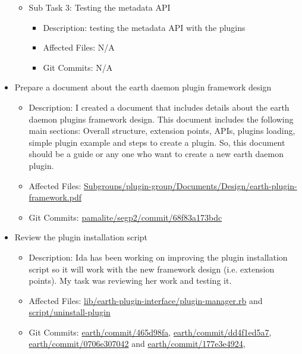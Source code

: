 \documentclass{article}
\begin{document}
\begin{itemize}
\begin{itemize}
\begin{itemize}
			\end{itemize}
		\item Sub Task 3: Testing the metadata API
			\begin{itemize}
			\item Description: testing the metadata API with the plugins  
			\item Affected Files: N/A
			\item Git Commits: N/A
			
			\end{itemize}
		\end{itemize} 
\newpage     
	\item Prepare a document about the earth daemon plugin framework design
		\begin{itemize}
		\item Description: I created a document that includes details about the earth daemon plugins framework design. This document includes the following main sections: Overall structure, extension points, APIs, plugins loading, simple plugin example and steps to create a plugin. So, this document should be a guide or any one who want to create a new earth daemon plugin. 
		\item Affected Files: \href{https://github.com/pamalite/segp2/tree/master/Subgroups/plugin_group/Documents/Design/earth_plugin_framework.pdf}{Subgroups/plugin-group/Documents/Design/earth-plugin-framework.pdf}
		\item Git Commits: \href{https://github.com/pamalite/segp2/commit/68f83a173bdc}{pamalite/segp2/commit/68f83a173bdc}
		
		\end{itemize}
	\item Review the plugin installation script 
		\begin{itemize}
		\item Description: Ida has been working on improving the plugin installation script so it will work with the new framework design (i.e. extension points). My task was reviewing her work and testing it. 
		\item Affected Files: \href{http://github.com/mfbDev/earth/tree/master/lib/earth_plugin_interface/plugin_manager.rb}{lib/earth-plugin-interface/plugin-manager.rb} and \newline
\href{http://github.com/mfbDev/earth/tree/master/script/uninstall_plugin}{script/uninstall-plugin}
		\item Git Commits: 
\href{http://github.com/mfbDev/earth/commit/465d98fa}{earth/commit/465d98fa}, \newline 
\href{http://github.com/mfbDev/earth/commit/dd4f1ed5a7}{earth/commit/dd4f1ed5a7}, \newline 
\href{http://github.com/mfbDev/earth/commit/0706e307042}{earth/commit/0706e307042} and \newline 
\href{http://github.com/mfbDev/earth/commit/177e3e4924}{earth/commit/177e3e4924}, \newline 
		

\end{itemize}
\end{itemize}
\end{document}
